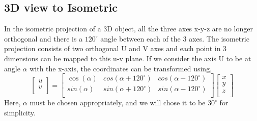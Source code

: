 \documentclass{article}
\begin{document}
\subsection{3D view to Isometric}
In the isometric projection of a 3D object, all the three axes x-y-z are no longer orthogonal and there is a $120^{\circ}$ angle between each of the 3 axes. The isometric projection consists of two orthogonal U and V axes and each point in 3 dimensions can be mapped to this u-v plane. If we consider the axis U to be at angle $\alpha$ with the x-axis, the coordinates can be transformed using,
    \[\begin{bmatrix}u\\v\\\end{bmatrix} = \begin{bmatrix}\cos(\alpha) & cos(\alpha + 120^{\circ}) & cos(\alpha - 120^{\circ})\\sin(\alpha) & sin(\alpha + 120^{\circ}) & sin(\alpha - 120^{\circ})\\\end{bmatrix}\begin{bmatrix}x\\y\\z\\\end{bmatrix}\]
Here, $\alpha$ must be chosen appropriately, and we will chose it to be $30^{\circ}$ for simplicity.
\end{document}
